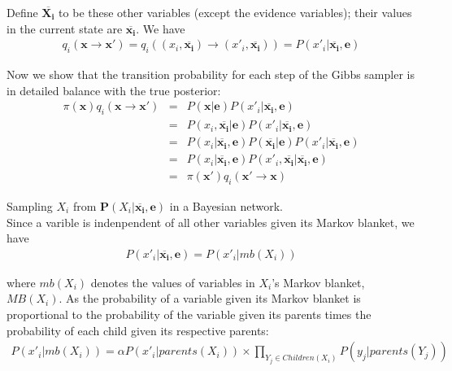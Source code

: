 \documentclass[12pt]{article}
\begin{document}
Define $\overline{\boldsymbol{X_i}}$ to be these other variables (except the evidence variables); their values in the current state are $\overline{\boldsymbol{x_i}}$. We have
\begin{eqnarray*}
q_i(\boldsymbol{x} \rightarrow \boldsymbol{x'})
= q_i((x_i, \overline{\boldsymbol{x_i}}) \rightarrow 
  (x'_i, \overline{\boldsymbol{x_i}}))
= P(x'_i | \overline{\boldsymbol{x_i}}, \boldsymbol{e})
\end{eqnarray*}

Now we show that the transition probability for each step of the Gibbs sampler is in detailed balance with the true posterior:
\begin{eqnarray*}
\pi(\boldsymbol{x}) q_i(\boldsymbol{x} \rightarrow \boldsymbol{x'})
&=& P(\boldsymbol{x}|\boldsymbol{e})
    P(x'_i| \overline{\boldsymbol{x_i}},\boldsymbol{e}) \\
&=& P(x_i, \overline{\boldsymbol{x_i}} | \boldsymbol{e})
    P(x'_i| \overline{\boldsymbol{x_i}},\boldsymbol{e}) \\
&=& P(x_i | \overline{\boldsymbol{x_i}}, \boldsymbol{e})
    P(\overline{\boldsymbol{x_i}} | \boldsymbol{e})
    P(x'_i | \overline{\boldsymbol{x_i}},\boldsymbol{e}) \\
&=& P(x_i | \overline{\boldsymbol{x_i}}, \boldsymbol{e})
    P(x'_i, \overline{\boldsymbol{x_i}} 
      | \overline{\boldsymbol{x_i}},\boldsymbol{e}) \\
&=& \pi(\boldsymbol{x'}) q_i(\boldsymbol{x'} \rightarrow \boldsymbol{x})
\end{eqnarray*}

Sampling $X_i$ from $\boldsymbol{P}(X_i | \overline{\boldsymbol{x_i}}, \boldsymbol{e})$ in a Bayesian network. \\

Since a varible is indenpendent of all other variables given its Markov blanket, we have
\begin{eqnarray*}
P(x'_i | \overline{\boldsymbol{x_i}}, \boldsymbol{e}) = P(x'_i | mb(X_i))
\end{eqnarray*}

where $mb(X_i)$ denotes the values of variables in $X_i$'s Markov blanket, $MB(X_i)$. As the probability of a variable given its Markov blanket is proportional to the probability of the variable given its parents times the probability of each child given its respective parents:
\begin{eqnarray*}
P(x'_i|mb(X_i))
= \alpha P(x'_i | parents(X_i)) \times
  \prod_{Y_j \in Children(X_i)} P(y_j | parents(Y_j))
\end{eqnarray*}
\end{document}
